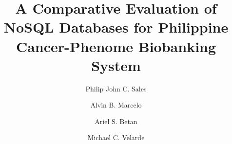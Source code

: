 \documentclass[review]{elsarticle}
\begin{document}
\begin{frontmatter}

\title{A Comparative Evaluation of NoSQL Databases for Philippine Cancer-Phenome Biobanking System}


\author[mymainaddress]{Philip John C. Sales}

\author[mymainaddress]{Alvin B. Marcelo}

\author[mymainaddress,mytertiaryaddress]{Ariel S. Betan}

\author[mysecondaryaddress]{Michael C. Velarde}


\address[mymainaddress]{Medical Informatics Unit, College of Medicine, University of the Philippines, Ermita, Metro Manila}
\address[mysecondaryaddress]{Regenerative Biology Research Laboratory, Institute of Biology, University of the Philippines, Quezon City, Diliman }
\address[mytertiaryaddress]{College of Arts and Sciences, University of the Philippines, Ermita, Metro Manila}


\end{frontmatter}
\end{document}
